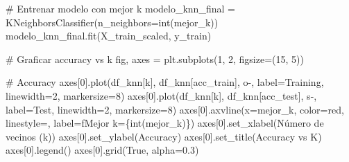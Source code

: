 \documentclass[
  doc,
  floatsintext,
  longtable,
  a4paper,
  nolmodern,
  notxfonts,
  notimes,
  12pt,
  colorlinks=true,linkcolor=blue,citecolor=blue,urlcolor=blue]{apa7}
\newenvironment{Shaded}{\begin{snugshade}}{\end{snugshade}}
\newcommand{\BuiltInTok}[1]{\textcolor[rgb]{0.00,0.23,0.31}{#1}}
\newcommand{\CommentTok}[1]{\textcolor[rgb]{0.37,0.37,0.37}{#1}}
\newcommand{\DecValTok}[1]{\textcolor[rgb]{0.68,0.00,0.00}{#1}}
\newcommand{\FloatTok}[1]{\textcolor[rgb]{0.68,0.00,0.00}{#1}}
\newcommand{\NormalTok}[1]{\textcolor[rgb]{0.00,0.23,0.31}{#1}}
\newcommand{\OperatorTok}[1]{\textcolor[rgb]{0.37,0.37,0.37}{#1}}
\newcommand{\SpecialCharTok}[1]{\textcolor[rgb]{0.37,0.37,0.37}{#1}}
\newcommand{\SpecialStringTok}[1]{\textcolor[rgb]{0.13,0.47,0.30}{#1}}
\newcommand{\StringTok}[1]{\textcolor[rgb]{0.13,0.47,0.30}{#1}}
\newcommand{\VariableTok}[1]{\textcolor[rgb]{0.07,0.07,0.07}{#1}}
\begin{document}
\begin{Shaded}
\begin{Highlighting}[]
\CommentTok{\# Entrenar modelo con mejor k}
\NormalTok{modelo\_knn\_final }\OperatorTok{=}\NormalTok{ KNeighborsClassifier(n\_neighbors}\OperatorTok{=}\BuiltInTok{int}\NormalTok{(mejor\_k))}
\NormalTok{modelo\_knn\_final.fit(X\_train\_scaled, y\_train)}

\CommentTok{\# Graficar accuracy vs k}
\NormalTok{fig, axes }\OperatorTok{=}\NormalTok{ plt.subplots(}\DecValTok{1}\NormalTok{, }\DecValTok{2}\NormalTok{, figsize}\OperatorTok{=}\NormalTok{(}\DecValTok{15}\NormalTok{, }\DecValTok{5}\NormalTok{))}

\CommentTok{\# Accuracy}
\NormalTok{axes[}\DecValTok{0}\NormalTok{].plot(df\_knn[}\StringTok{\textquotesingle{}k\textquotesingle{}}\NormalTok{], df\_knn[}\StringTok{\textquotesingle{}acc\_train\textquotesingle{}}\NormalTok{], }\StringTok{\textquotesingle{}o{-}\textquotesingle{}}\NormalTok{, }
\NormalTok{             label}\OperatorTok{=}\StringTok{\textquotesingle{}Training\textquotesingle{}}\NormalTok{, linewidth}\OperatorTok{=}\DecValTok{2}\NormalTok{, markersize}\OperatorTok{=}\DecValTok{8}\NormalTok{)}
\NormalTok{axes[}\DecValTok{0}\NormalTok{].plot(df\_knn[}\StringTok{\textquotesingle{}k\textquotesingle{}}\NormalTok{], df\_knn[}\StringTok{\textquotesingle{}acc\_test\textquotesingle{}}\NormalTok{], }\StringTok{\textquotesingle{}s{-}\textquotesingle{}}\NormalTok{, }
\NormalTok{             label}\OperatorTok{=}\StringTok{\textquotesingle{}Test\textquotesingle{}}\NormalTok{, linewidth}\OperatorTok{=}\DecValTok{2}\NormalTok{, markersize}\OperatorTok{=}\DecValTok{8}\NormalTok{)}
\NormalTok{axes[}\DecValTok{0}\NormalTok{].axvline(x}\OperatorTok{=}\NormalTok{mejor\_k, color}\OperatorTok{=}\StringTok{\textquotesingle{}red\textquotesingle{}}\NormalTok{, linestyle}\OperatorTok{=}\StringTok{\textquotesingle{}{-}{-}\textquotesingle{}}\NormalTok{, }
\NormalTok{                label}\OperatorTok{=}\SpecialStringTok{f\textquotesingle{}Mejor k=}\SpecialCharTok{\{}\BuiltInTok{int}\NormalTok{(mejor\_k)}\SpecialCharTok{\}}\SpecialStringTok{\textquotesingle{}}\NormalTok{)}
\NormalTok{axes[}\DecValTok{0}\NormalTok{].set\_xlabel(}\StringTok{\textquotesingle{}Número de vecinos (k)\textquotesingle{}}\NormalTok{)}
\NormalTok{axes[}\DecValTok{0}\NormalTok{].set\_ylabel(}\StringTok{\textquotesingle{}Accuracy\textquotesingle{}}\NormalTok{)}
\NormalTok{axes[}\DecValTok{0}\NormalTok{].set\_title(}\StringTok{\textquotesingle{}Accuracy vs K\textquotesingle{}}\NormalTok{)}
\NormalTok{axes[}\DecValTok{0}\NormalTok{].legend()}
\NormalTok{axes[}\DecValTok{0}\NormalTok{].grid(}\VariableTok{True}\NormalTok{, alpha}\OperatorTok{=}\FloatTok{0.3}\NormalTok{)}


\end{Highlighting}
\end{Shaded}
\end{document}
